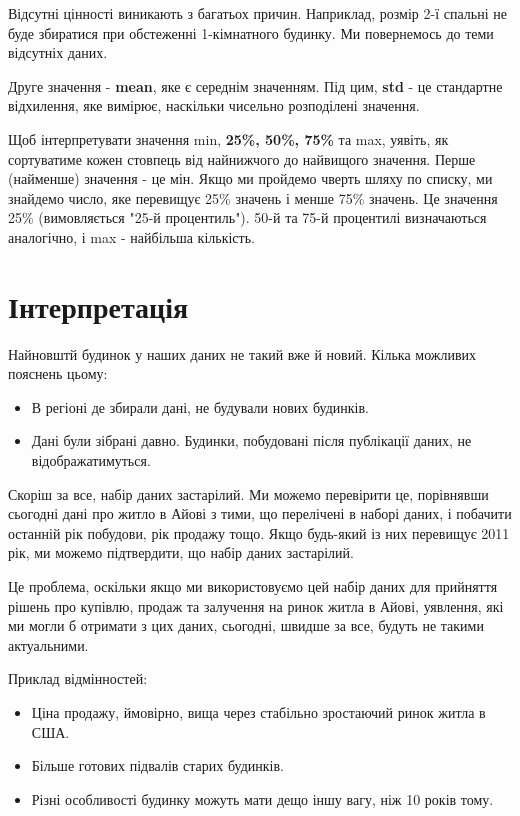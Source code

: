 Відсутні цінності виникають з багатьох причин.
Наприклад, розмір 2-ї спальні не буде збиратися при обстеженні 1-кімнатного будинку.
Ми повернемось до теми відсутніх даних.

Друге значення - \textbf{mean}, яке є середнім значенням.
Під цим, \textbf{std} - це стандартне відхилення, яке вимірює, наскільки чисельно розподілені значення.

Щоб інтерпретувати значення min, \textbf{25\%, 50\%, 75\%} та max, уявіть, як сортуватиме кожен стовпець від найнижчого до найвищого значення.
Перше (найменше) значення - це мін.
Якщо ми пройдемо чверть шляху по списку, ми знайдемо число, яке перевищує 25\% значень і менше 75\% значень.
Це значення 25\% (вимовляється "25-й процентиль").
50-й та 75-й процентилі визначаються аналогічно, і max - найбільша кількість.

\section{Інтерпретація}\label{sec:interpretation}

Найновштй будинок у наших даних не такий вже й новий.
Кілька можливих пояснень цьому:

\begin{itemize}
    \item В регіоні де збирали дані, не будували нових будинків.
    \item Дані були зібрані давно. Будинки, побудовані після публікації даних, не відображатимуться.
\end{itemize}

Скоріш за все, набір даних застарілий.
Ми можемо перевірити це, порівнявши сьогодні дані про житло в Айові з тими, що перелічені в наборі даних, і побачити останній рік побудови, рік продажу тощо.
Якщо будь-який із них перевищує 2011 рік, ми можемо підтвердити, що набір даних застарілий.

Це проблема, оскільки якщо ми використовуємо цей набір даних для прийняття рішень про купівлю, продаж та залучення на ринок житла в Айові, уявлення, які ми могли б отримати з цих даних, сьогодні, швидше за все, будуть не такими актуальними.

Приклад відмінностей:
\begin{itemize}
    \item Ціна продажу, ймовірно, вища через стабільно зростаючий ринок житла в США.
    \item Більше готових підвалів старих будинків.
    \item Різні особливості будинку можуть мати дещо іншу вагу, ніж 10 років тому.
\end{itemize}
